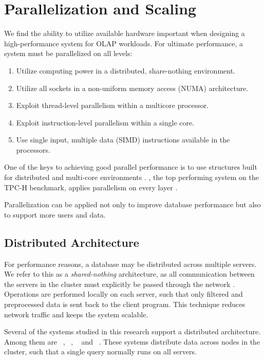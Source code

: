 \chapter{Parallelization and Scaling}
\label{chap:Parallelization and Scaling}

We find the ability to utilize available hardware important when designing a high-performance system for OLAP workloads. For ultimate performance, a system must be parallelized on all levels:

\begin{enumerate}
  \item Utilize computing power in a distributed, share-nothing environment.
  \item Utilize all sockets in a non-uniform memory access (NUMA) architecture.
  \item Exploit thread-level parallelism within a multicore processor.
  \item Exploit instruction-level parallelism within a single core.
  \item Use single input, multiple data (SIMD) instructions available in the processors.
\end{enumerate}

One of the keys to achieving good parallel performance is to use structures built for distributed and multi-core environments \cite{Primsch2011-ij}. \exasol, the top performing system on the TPC-H benchmark, applies parallelism on every layer \cite{Exasol2014-xh}.

Parallelization can be applied not only to improve database performance but also to support more users and data.

\newpage

\section{Distributed Architecture}
\label{sec:Distributed Architecture}
For performance reasons, a database may be distributed across multiple servers. We refer to this as a \textit{shared-nothing} architecture, as all communication between the servers in the cluster must explicitly be passed through the network \cite{DeWitt1992-ki}. Operations are performed locally on each server,  such that only filtered and preprocessed data is sent back to the client program. This technique reduces network traffic and keeps the system scalable. 


Several of the systems studied in this research support a distributed architecture. Among them are \oracle~\cite{Mukherjee2015-ul}, \cstore~\cite{Stonebraker2005-qz}, \saph~\cite{Farber2012-vh} and \exasol~\cite{Exasol2014-xh}. These systems distribute data across nodes in the cluster, such that a single query normally runs on all servers.

